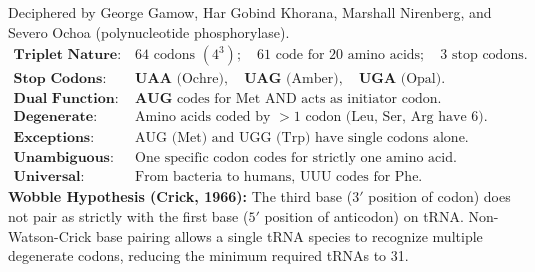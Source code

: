 \documentclass[10pt,a4paper]{article}
\begin{document}
\begin{formulabox}
Deciphered by George Gamow, Har Gobind Khorana, Marshall Nirenberg, and Severo Ochoa (polynucleotide phosphorylase).
\begin{align*}
  \textbf{Triplet Nature: } & 64 \text{ codons } (4^3); \quad 61 \text{ code for 20 amino acids}; \quad 3 \text{ stop codons.}\\
  \textbf{Stop Codons: } & \mathbf{UAA} \text{ (Ochre)}, \quad \mathbf{UAG} \text{ (Amber)}, \quad \mathbf{UGA} \text{ (Opal)}.\\
  \textbf{Dual Function: } & \mathbf{AUG} \text{ codes for Met AND acts as initiator codon.}\\
  \textbf{Degenerate: } & \text{Amino acids coded by }>1\text{ codon (Leu, Ser, Arg have 6).}\\
  \textbf{Exceptions: } & \text{AUG (Met) and UGG (Trp) have single codons alone.}\\
  \textbf{Unambiguous: } & \text{One specific codon codes for strictly one amino acid.}\\
  \textbf{Universal: } & \text{From bacteria to humans, UUU codes for Phe.}
\end{align*}
\textbf{Wobble Hypothesis (Crick, 1966):}
The third base ($3'$ position of codon) does not pair as strictly with the first base ($5'$ position of anticodon) on tRNA. Non-Watson-Crick base pairing allows a single tRNA species to recognize multiple degenerate codons, reducing the minimum required tRNAs to 31.
\end{formulabox}
\end{document}
